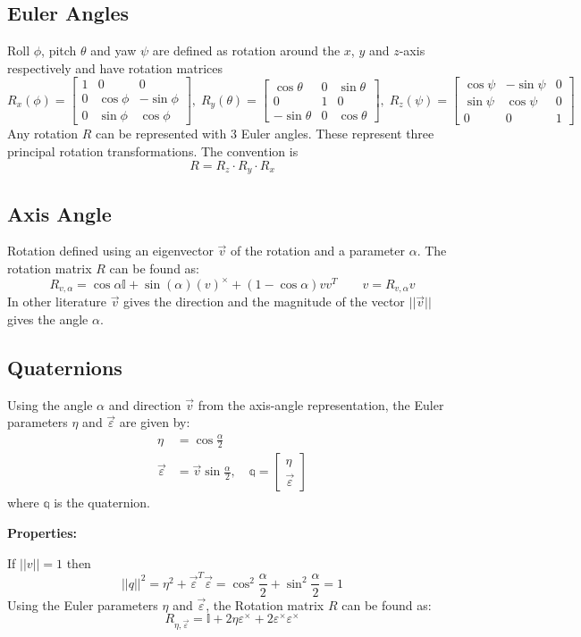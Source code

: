 \subsection{Euler Angles}
Roll $\phi$, pitch $\theta$ and yaw $\psi$ are defined as rotation around the $x$, $y$ and $z$-axis respectively and have rotation matrices
$$
R_x(\phi)=
\begin{bmatrix}
1 & 0 & 0 \\ 0 & \cos\phi & -\sin\phi \\ 0 & \sin\phi & \cos\phi
\end{bmatrix}
,\;
R_y(\theta)=
\begin{bmatrix}
\cos\theta & 0 & \sin\theta \\ 0 & 1 & 0 \\ -\sin\theta & 0 & \cos\theta
\end{bmatrix}
,\;
R_z(\psi)=
\begin{bmatrix}
\cos\psi & -\sin\psi & 0 \\ \sin\psi & \cos\psi & 0 \\ 0 & 0 & 1
\end{bmatrix}
$$
Any rotation $R$ can be represented with 3 Euler angles.
These represent three principal rotation transformations. The convention is
$$
R=R_z\cdot R_y\cdot R_x
$$



\subsection{Axis Angle}
Rotation defined using an eigenvector $\vec v$ of the rotation and a parameter $\alpha$. The rotation matrix $R$ can be found as:
$$
R_{v,\alpha}=\cos\alpha \mathbb{I}+\sin(\alpha)(v)^\times+(1-\cos\alpha)vv^T
\qquad v=R_{v,\alpha}v$$
In other literature $\vec v$ gives the direction and the magnitude of the vector $||\vec v||$ gives the angle $\alpha$.



\subsection{Quaternions}
Using the angle $\alpha$ and direction $\vec v$ from the axis-angle representation, the Euler parameters $\eta$ and $\vec\varepsilon$ are given by:
\begin{align}
\eta&=\cos \frac{\alpha}{2}\\
\vec{\varepsilon}&=\vec{v}\sin \frac{\alpha}{2},\quad \mathbb{q}=\begin{bmatrix}
\eta \\ \vec{\varepsilon}
\end{bmatrix}
\end{align}
where $\mathbb q$ is the quaternion.

\textbf{Properties:}

If $||v||=1$ then
$$
||q||^2=\eta^2+\vec{\varepsilon}^T\vec{\varepsilon}=\cos^2 \frac{\alpha}{2}+\sin^2 \frac{\alpha}{2}=1
$$
Using the Euler parameters $\eta$ and $\vec\varepsilon$, the Rotation matrix $R$ can be found as:
$$
R_{\eta,\vec{\varepsilon}}=\mathbb{I}+2\eta {\varepsilon}^\times+2{\varepsilon}^\times{\varepsilon}^\times
$$